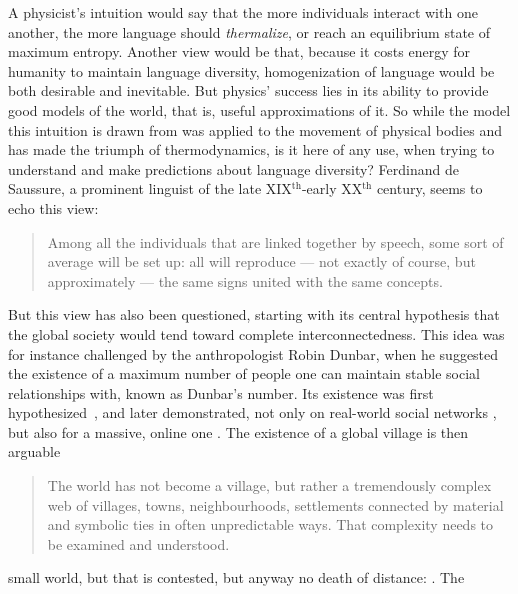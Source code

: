 \documentclass[../thesis.tex]{subfiles}
\begin{document}
A physicist's intuition would say that the more individuals interact with one another,
the more language should \emph{thermalize}, or reach an equilibrium state of maximum
entropy. Another view would be that, because it costs energy for humanity to maintain
language diversity, homogenization of language would be both desirable and inevitable.
But physics' success lies in its ability to provide good models of the world, that is,
useful approximations of it. So while the model this intuition is drawn from was applied
to the movement of physical bodies and has made the triumph of thermodynamics, is it
here of any use, when trying to understand and make predictions about language
diversity? Ferdinand de Saussure, a prominent linguist of the late XIX$^\text{th}$-early
XX$^\text{th}$ century, seems to echo this view:

\begin{quote}
  Among all the individuals that are linked together by speech, some sort of average
  will be set up: all will reproduce --- not exactly of course, but approximately ---
  the same signs united with the same concepts. \cite{deSaussureCourseGeneral2011}
\end{quote}


But this view has also been questioned, starting with its central hypothesis that the global society would tend toward complete interconnectedness.
This idea was for instance challenged by the anthropologist Robin Dunbar, when he suggested the existence of a maximum number of people one can maintain stable social relationships with, known as Dunbar's number. Its existence was first hypothesized~\cite{DunbarNeocortexSize1992,DunbarSocialBrain1998}, and later demonstrated, not only on real-world social networks \cite{HillSocialNetwork2003,McCartyComparingTwo2005}, but also for a massive, online one \cite{GoncalvesModelingUsers2011a}.
The existence of a global village is then arguable

\begin{quote}
  The world has not become a village, but rather a tremendously complex web of villages,
  towns, neighbourhoods, settlements connected by material and symbolic ties in often
  unpredictable ways. That complexity needs to be examined and understood.
  \cite{BlommaertSociolinguisticsGlobalization2010}
\end{quote}
 
small world, but that is contested, but anyway no death of distance: 
. The %
\end{document}
